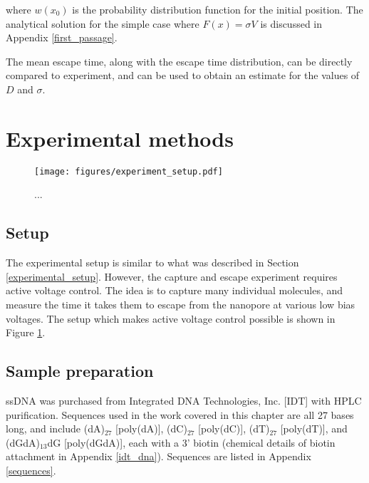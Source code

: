\noindent
where $w(x_0)$ is the probability distribution function for the initial position.  The analytical solution for the simple case where $F(x) = \sigma V$ is discussed in Appendix \ref{first_passage}.

The mean escape time, along with the escape time distribution, can be directly compared to experiment, and can be used to obtain an estimate for the values of $D$ and $\sigma$.

\section{Experimental methods}


\begin{figure}[h]
\begin{centering}
\texttt{[image: figures/experiment\_setup.pdf]}
\caption[Experimental setup for capture and escape]{...}
\label{fig:setup_capture}
\end{centering}
\end{figure}

\subsection{Setup}

The experimental setup is similar to what was described in Section \ref{experimental_setup}.  However, the capture and escape experiment requires active voltage control.  The idea is to capture many individual molecules, and measure the time it takes them to escape from the nanopore at various low bias voltages.  The setup which makes active voltage control possible is shown in Figure \ref{fig:setup_capture}.

\subsection{Sample preparation}

ssDNA was purchased from Integrated DNA Technologies, Inc. [IDT] with HPLC purification.  Sequences used in the work covered in this chapter are all 27 bases long, and include (dA)$_{27}$ [poly(dA)], (dC)$_{27}$ [poly(dC)], (dT)$_{27}$ [poly(dT)], and (dGdA)$_{13}$dG [poly(dGdA)], each with a 3' biotin (chemical details of biotin attachment in Appendix \ref{idt_dna}).  Sequences are listed in Appendix \ref{sequences}.

